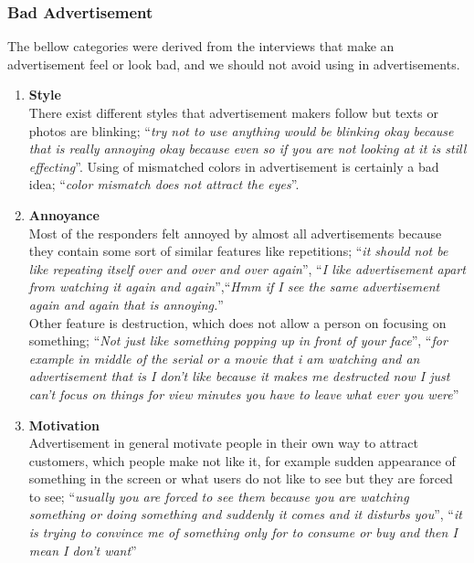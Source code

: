 


\subsubsection{Bad Advertisement}
The bellow categories were derived from the interviews that make an advertisement feel or look bad, and we should not avoid using in advertisements.

\begin{enumerate}
\item \textbf{Style} \\
There exist different styles that advertisement makers follow but texts or photos are blinking; ``\emph{try not to use anything would be blinking okay because that is really annoying okay because even so if you are not looking at it is still effecting}''. Using of mismatched colors in advertisement is certainly a bad idea; ``\emph{color mismatch does not attract the eyes}''.

\item \textbf{Annoyance} \\
Most of the responders felt annoyed by almost all advertisements because they contain some sort of similar features like repetitions; ``\emph{it should not be like repeating itself over and over and over again}'', ``\emph{I like advertisement apart from watching it again and again}'',``\emph{Hmm if I see the same advertisement again and again that is annoying.}'' \\
Other feature is destruction, which does not allow a person on focusing on something; ``\emph{Not just like something popping up in front of your face}'', ``\emph{for example in middle of the serial or a movie that i am watching and an advertisement that is I don't like because it makes me destructed now I just can't focus on things for view minutes you have to leave what ever you were}''

\item \textbf{Motivation} \\
Advertisement in general motivate people in their own way to attract customers, which people make not like it, for example sudden appearance of something in the screen or what users do not like to see but they are forced to see; ``\emph{usually you are forced to see them because you are watching something or doing something and suddenly it comes and it disturbs you}'', ``\emph{it is trying to convince me of something only for to consume or buy and then I mean I don't want}''


\end{enumerate}
